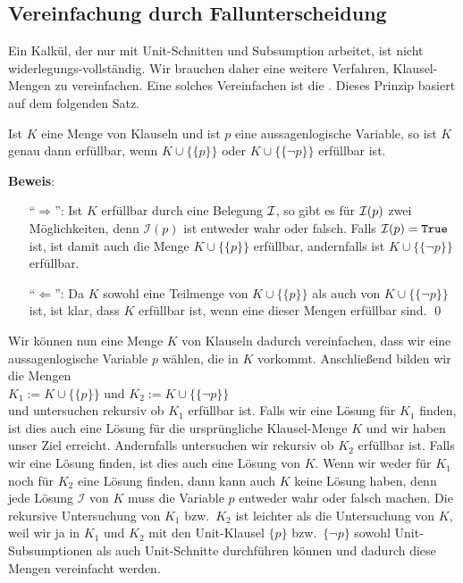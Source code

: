 \subsection{Vereinfachung durch Fallunterscheidung}
Ein Kalkül, der nur mit Unit-Schnitten und Subsumption arbeitet, ist nicht 
widerlegungs-vollständig.  Wir brauchen 
daher eine weitere Verfahren, Klausel-Mengen zu vereinfachen.
Eine solches Vereinfachen ist die .  Dieses Prinzip basiert
auf dem folgenden Satz.

\begin{Satz}
  Ist $K$ eine Menge von Klauseln und ist $p$ eine aussagenlogische Variable, 
  so ist $K$ genau dann erfüllbar, wenn $K \cup \bigl\{\{p\}\bigr\}$ oder 
  $K \cup \bigl\{\{\neg p\}\bigr\}$ erfüllbar ist.  
\end{Satz}

\noindent
\textbf{Beweis}:
\begin{enumerate}
\item[``$\Rightarrow$'':] 
  Ist $K$ erfüllbar durch eine Belegung $\mathcal{I}$, so gibt es für  $\mathcal{I}(p)$ zwei Möglichkeiten, denn 
  $\mathcal{I}(p)$ ist entweder wahr oder falsch.  Falls $\mathcal{I}(p) = \texttt{True}$ ist, ist damit auch die Menge $K \cup
  \bigl\{\{p\}\bigr\}$ erfüllbar,
  andernfalls ist $K \cup \bigl\{\{\neg p\}\bigr\}$
  erfüllbar. 
\item[``$\Leftarrow$'':] 
  Da $K$ sowohl eine Teilmenge von $K \cup \bigl\{\{p\}\bigr\}$ als auch von 
  $K \cup \bigl\{\{\neg p\}\bigr\}$ ist, ist klar, dass $K$ erfüllbar
  ist, wenn eine dieser Mengen erfüllbar sind.  
\qed
\end{enumerate}

Wir können nun eine Menge $K$ von Klauseln dadurch vereinfachen, dass wir eine
aussagenlogische Variable $p$ wählen, die in $K$ vorkommt.
Anschließend bilden wir die Mengen \\[0.2cm]
\hspace*{1.3cm} $K_1 := K \cup \bigl\{\{p\}\bigr\}$ \quad und \quad $K_2 := K \cup
\bigl\{\{\neg p\}\bigr\}$
\\[0.2cm]
und untersuchen rekursiv ob $K_1$ erfüllbar ist.  Falls wir eine Lösung für $K_1$ finden,
ist dies auch eine Lösung für die ursprüngliche Klausel-Menge $K$ und wir haben unser Ziel
erreicht.
Andernfalls untersuchen wir rekursiv ob $K_2$ erfüllbar ist.
Falls wir eine Lösung finden, ist dies auch eine Lösung von $K$.  Wenn wir weder
für $K_1$ noch für $K_2$ eine Lösung finden, dann kann auch $K$ keine Lösung haben,
denn jede Lösung $\mathcal{I}$ von $K$ muss die Variable $p$ entweder wahr oder falsch machen.
Die rekursive Untersuchung von $K_1$ bzw.~$K_2$ ist leichter als die Untersuchung von $K$,
weil wir ja in $K_1$ und $K_2$ mit den Unit-Klausel $\{p\}$ bzw.~$\{\neg p\}$
sowohl Unit-Subsumptionen als auch Unit-Schnitte durchführen können und dadurch diese Mengen vereinfacht
werden. 


